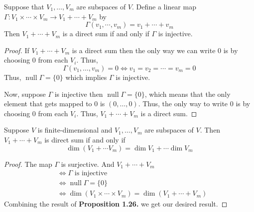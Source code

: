 \begin{proposition}
    Suppose that $V_1, \ldots, V_m$ are subspaces of $V$. Define a linear map $\Gamma : V_1 \times \cdots \times V_m \to V_1 + \cdots + V_m$
    by
    \[ \Gamma(v_1, \cdots, v_m) = v_1 + \cdots + v_m \]
    Then $V_1 + \cdots + V_m$ is a direct sum if and only if  $\Gamma$ is injective.
\end{proposition}

\begin{proof}
    If $V_1 + \cdots + V_m$ is a direct sum then the only way we can write $0$ is by choosing $0$ from each $V_i$. Thus,
    \[ \Gamma(v_1, \ldots, v_m) = 0 \iff v_1 = v_2 = \cdots = v_m = 0 \]
    Thus, $\operatorname{null} \Gamma = \{0\}$ which implies $\Gamma$ is injective.
    
    Now, suppose $\Gamma$ is injective then $\operatorname{null} \Gamma = \{0\}$, which means that the only element that gets mapped to $0$
    is $(0,\ldots,0)$. Thus, the only way to write $0$ is by choosing $0$ from each $V_i$. Thus, $V_1 + \cdots + V_m$ is a direct sum. 
\end{proof}

\begin{proposition}
    Suppose $V$ is finite-dimensional and $V_1, \ldots, V_m$ are subspaces of $V$. Then $V_1 + \cdots + V_m$ is direct sum if and only if
    \[ \dim (V_1 + \cdots V_m) = \dim V_1 + \cdots \dim V_m \]
\end{proposition}

\begin{proof}
    The map $\Gamma$ is surjective. And $V_1 + \cdots + V_m$  
    \begin{align*}
        & \iff \Gamma \text{ is injective} \\
        & \iff \operatorname{null} \Gamma = \{0\} \\
        & \iff \dim (V_1 \times \cdots \times V_m) = \dim(V_1 + \cdots + V_m)
    \end{align*}
    Combining the result of \textbf{Proposition 1.26.} we get our desired result.
\end{proof}